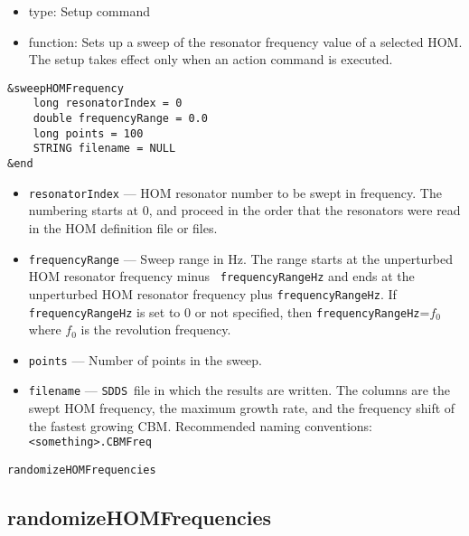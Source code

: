 \documentclass[11pt]{article}
\newcommand{\SDDS}{{\tt SDDS}}
\begin{document}
\begin{itemize}
\item type: Setup command
\item function: Sets up a sweep of the resonator frequency value of a
selected HOM. The setup takes effect only when an action command is
executed.
\end{itemize}
\begin{verbatim}
&sweepHOMFrequency
    long resonatorIndex = 0
    double frequencyRange = 0.0
    long points = 100
    STRING filename = NULL
&end
\end{verbatim}
\begin{itemize}
\item {\tt resonatorIndex} --- HOM resonator number to be swept in
frequency. The numbering starts at 0, and proceed in the order that
the resonators were read in the HOM definition file or files.
\item {\tt frequencyRange} --- Sweep range in Hz. The range starts
at the unperturbed HOM resonator frequency minus {\tt
frequencyRangeHz} and ends at the unperturbed HOM resonator frequency
plus {\tt frequencyRangeHz}. If {\tt frequencyRangeHz} is set to 0 or
not specified, then {\tt frequencyRangeHz}=$f_0$ where $f_0$ is the
revolution frequency.
\item {\tt points} --- Number of points in the sweep.
\item {\tt filename} --- \SDDS\ file in which the results are
written. The columns are the swept HOM frequency, the maximum growth
rate, and the frequency shift of the fastest growing CBM. Recommended
naming conventions: {\tt <something>.CBMFreq}
\end{itemize}

\newpage
\begin{center}\tt randomizeHOMFrequencies\end{center}
\subsection{randomizeHOMFrequencies}
\end{document}
